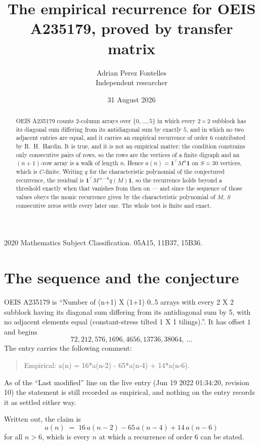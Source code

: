 \documentclass[11pt,a4paper]{article}
\title{The empirical recurrence for OEIS A235179, proved by transfer matrix}
\author{Adrian Perez Fontelles\\ \small Independent researcher}
\date{31 August 2026}
\theoremstyle{plain}
\theoremstyle{definition}
\begin{document}
\maketitle

\begin{abstract}
OEIS A235179 counts $2$-column arrays over $\{0,\dots,5\}$ in which every
$2\times2$ subblock has its diagonal sum differing from its antidiagonal sum by
exactly $5$, and in which no two adjacent entries are equal, and it
carries an empirical recurrence of order $6$ contributed by R.~H.~Hardin. It is true,
and it is not an empirical matter: the condition constrains only consecutive pairs of rows,
so the rows are the vertices of a finite digraph and an $(n+1)$-row array is a walk of
length $n$. Hence $a(n)=\mathbf{1}^{\!\top}M^{n}\mathbf{1}$ on $S=30$ vertices, which
is $C$-finite. Writing $q$ for the characteristic polynomial of the conjectured recurrence,
the residual is $\mathbf{1}^{\!\top}M^{\,n-6}q(M)\mathbf{1}$, so the recurrence
holds beyond a threshold exactly when that vanishes from then on --- and since the sequence
of those values obeys the monic recurrence given by the characteristic polynomial of $M$,
$S$ consecutive zeros settle every later one. The whole test is finite and exact.
\end{abstract}

\noindent\small 2020 Mathematics Subject Classification. 05A15, 11B37, 15B36.\normalsize

\section{The sequence and the conjecture}

OEIS A235179 is ``Number of (n+1) X (1+1) 0..5 arrays with every 2 X 2 subblock having its diagonal sum differing from its antidiagonal sum by 5, with no adjacent elements equal (constant-stress tilted 1 X 1 tilings).''. It has offset
$1$ and begins
\[
72, 212, 576, 1696, 4656, 13736, 38064,\ \dots
\]
The entry carries the following comment:
\begin{quote}\small
Empirical: a(n) = 16*a(n-2) - 65*a(n-4) + 14*a(n-6).
\end{quote}
As of the ``Last modified'' line on the live entry (Jun 19 2022 01:34:20, revision 10) the statement is
still recorded as empirical, and nothing on the entry records it as settled either way.

Written out, the claim is
\begin{equation}\label{eq:conj}
a(n)\;=\;16\,a(n-2) - 65\,a(n-4) + 14\,a(n-6)
\end{equation}
for all $n>6$, which is every $n$ at which a recurrence of order $6$ can be
stated.
\end{document}
